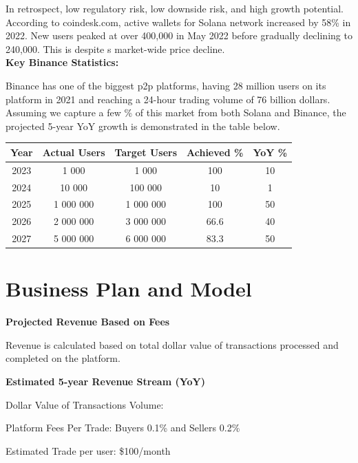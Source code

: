 \documentclass{article}
\begin{document}
In retrospect, low regulatory risk, low downside risk, and high growth potential. According to coindesk.com, active wallets for Solana network increased by 58\% in 2022. New users peaked at over 400,000 in May 2022 before gradually declining to 240,000. This is despite s market-wide price decline.\\

\textbf{Key Binance Statistics:}

Binance has one of the biggest p2p platforms, having 28 million users on its platform in 2021 and reaching a 24-hour trading volume of 76 billion dollars. 
Assuming we capture a few \% of this market from both Solana and Binance, the projected 5-year YoY growth is demonstrated in the table below.

\begin{table}[h]
    \centering
    \begin{tabular}{|c|c|c|c|c|} \hline 
         Year&  Actual Users&  Target Users&  Achieved \%& YoY \%\\ \hline 
         2023&  1 000&  1 000&  100& 10\\ \hline 
         2024&  10 000&  100 000&  10& 1\\ \hline 
         2025&  1 000 000&  1 000 000&  100& 50\\ \hline 
         2026&  2 000 000&  3 000 000&  66.6& 40\\ \hline 
         2027&  5 000 000&   6 000 000&  83.3& 50\\ \hline
    \end{tabular}
    
    
\end{table}


\section{Business Plan and Model}

\textbf{Projected Revenue Based on Fees}

Revenue is calculated based on total dollar value of transactions processed and completed on the platform.


\textbf{Estimated 5-year Revenue Stream (YoY)}

Dollar Value of Transactions Volume: 

Platform Fees Per Trade: Buyers 0.1\% and Sellers 0.2\%

Estimated Trade per user: \$100/month
\end{document}
